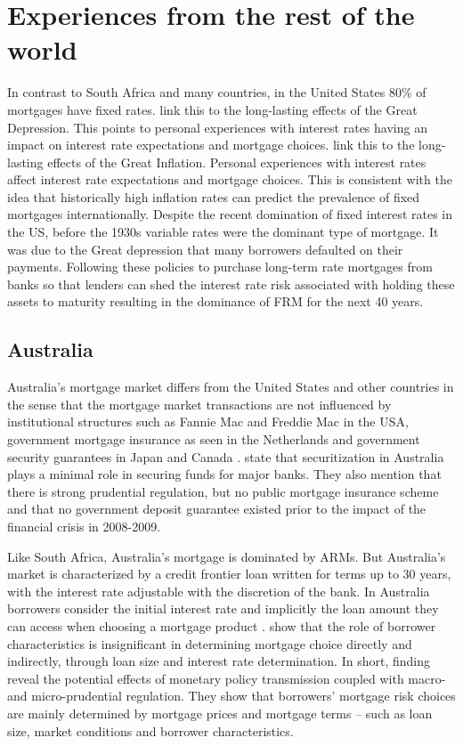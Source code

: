 \documentclass[
  letterpaper,
  DIV=11,
  numbers=noendperiod]{scrartcl}
\begin{document}
\section{Experiences from the rest of the
world}\label{experiences-from-the-rest-of-the-world}

In contrast to South Africa and many countries, in the United States
80\% of mortgages have fixed rates. \citet{botsch2023long} link this to
the long-lasting effects of the Great Depression. This points to
personal experiences with interest rates having an impact on interest
rate expectations and mortgage choices. \citet{botsch2023long} link this
to the long-lasting effects of the Great Inflation. Personal experiences
with interest rates affect interest rate expectations and mortgage
choices. This is consistent with the idea that historically high
inflation rates can predict the prevalence of fixed mortgages
internationally. Despite the recent domination of fixed interest rates
in the US, before the 1930s variable rates were the dominant type of
mortgage. It was due to the Great depression that many borrowers
defaulted on their payments. Following these policies to purchase
long-term rate mortgages from banks so that lenders can shed the
interest rate risk associated with holding these assets to maturity
resulting in the dominance of FRM for the next 40 years.

\subsection{Australia}\label{australia}

Australia's mortgage market differs from the United States and other
countries in the sense that the mortgage market transactions are not
influenced by institutional structures such as Fannie Mac and Freddie
Mac in the USA, government mortgage insurance as seen in the Netherlands
and government security guarantees in Japan and Canada
\citep{campbell2006household, frame2005fussing}.
\citet{dungey2015mortgage} state that securitization in Australia plays
a minimal role in securing funds for major banks. They also mention that
there is strong prudential regulation, but no public mortgage insurance
scheme and that no government deposit guarantee existed prior to the
impact of the financial crisis in 2008-2009.

Like South Africa, Australia's mortgage is dominated by ARMs. But
Australia's market is characterized by a credit frontier loan written
for terms up to 30 years, with the interest rate adjustable with the
discretion of the bank. In Australia borrowers consider the initial
interest rate and implicitly the loan amount they can access when
choosing a mortgage product \citet{dungey2018endogeneity}.
\citet{dungey2018endogeneity} show that the role of borrower
characteristics is insignificant in determining mortgage choice directly
and indirectly, through loan size and interest rate determination. In
short, \citet{dungey2018endogeneity} finding reveal the potential
effects of monetary policy transmission coupled with macro- and
micro-prudential regulation. They show that borrowers' mortgage risk
choices are mainly determined by mortgage prices and mortgage terms --
such as loan size, market conditions and borrower characteristics.
\end{document}
